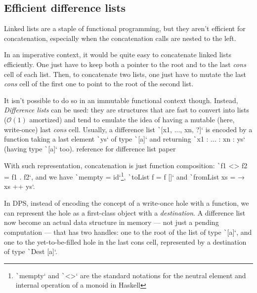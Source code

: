\documentclass[english]{jflart}
\newcommand{\TODO}[1]{{\color{red}\large #1}}
\begin{document}
\subsection{Efficient difference lists}

Linked lists are a staple of functional programming, but they aren't efficient for concatenation, especially when the concatenation calls are nested to the left.

In an imperative context, it would be quite easy to concatenate linked lists efficiently. One just have to keep both a pointer to the root and to the last \emph{cons} cell of each list. Then, to concatenate two lists, one just have to mutate the last \emph{cons} cell of the first one to point to the root of the second list.

It isn't possible to do so in an immutable functional context though. Instead, \emph{Difference lists} can be used: they are structures that are fast to convert into lists ($\mathcal{O}(1)$ amortized) and tend to emulate the idea of having a mutable (here, write-once) last \emph{cons} cell. Usually, a difference list \texttt`[x1, ..., xn, ?]` is encoded by a function taking a last element \texttt`ys` of type \texttt`[a]` and returning \texttt`x1 : ... : xn : ys` (having type \texttt`[a]` too). \TODO{reference for difference list paper}

With such representation, concatenation is just function composition: \texttt`f1 <> f2 = f1 . f2`, and we have \texttt`mempty = id`\footnote{\texttt`mempty` and \texttt`<>` are the standard notations for the neutral element and internal operation of a monoid in Haskell}, \texttt`toList f = f []` and \texttt`fromList xs = \ys → xs ++ ys`.

In DPS, instead of encoding the concept of a write-once hole with a function, we can represent the hole as a first-class object with a \emph{destination}. A difference list now become an actual data structure in memory --- not just a pending computation --- that has two handles: one to the root of the list of type \texttt`[a]`, and one to the yet-to-be-filled hole in the last cons cell, represented by a destination of type \texttt`Dest [a]`.
\end{document}
